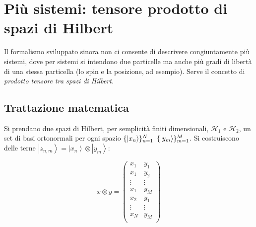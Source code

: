%
%
%

%

\chapter[Tensore prodotto di spazi di Hilbert]{Più sistemi: tensore prodotto di spazi di Hilbert} %
Il formalismo sviluppato sinora non ci consente di descrivere congiuntamente più sistemi, dove per sistemi si intendono due particelle ma anche più gradi di libertà di una stessa particella (lo spin e la posizione, ad esempio).  
Serve il concetto di \emph{prodotto tensore tra spazi di Hilbert.} \\

\section{Trattazione matematica} %
Si prendano due spazi di Hilbert, per semplicità finiti dimensionali, $\mathcal{H}_1$ e $\mathcal{H}_2$, un set di basi ortonormali per ogni spazio $\{ \ket{x_n} \}^N_{n=1} $ $\{ \ket{y_m} \}^M_{m=1} $. Si costruiscono delle terne $\left |z_{n,m} \right\rangle=\left |x_n \right\rangle\otimes \left |y_m \right\rangle$:

\begin{equation} 
\bar x \otimes \bar y = 
\begin{pmatrix}
x_1 & y_1 \\
x_1 & y_2 \\
\vdots & \vdots \\
x_1 & y_M\\
x_2 & y_1\\
\vdots & \vdots \\
x_N & y_M\\
\end{pmatrix}
\end{equation}

